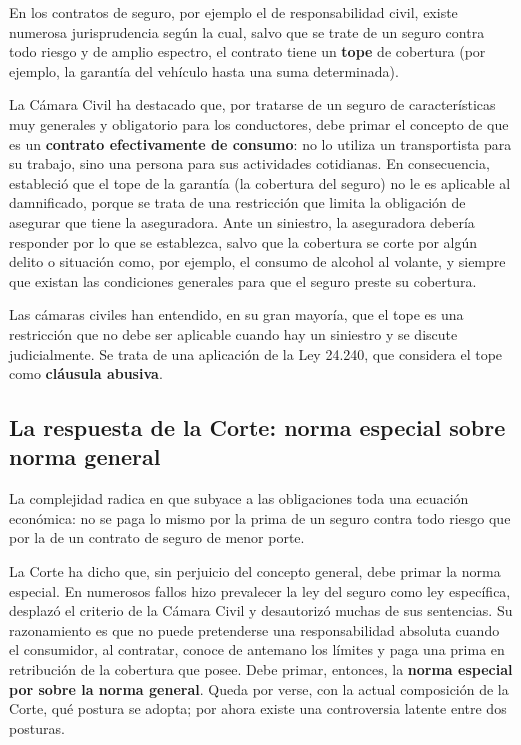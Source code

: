 \documentclass[12pt,oneside]{book}
\begin{document}
En los contratos de seguro, por ejemplo el de responsabilidad civil, existe numerosa jurisprudencia según la cual, salvo que se trate de un seguro contra todo riesgo y de amplio espectro, el contrato tiene un \textbf{tope} de cobertura (por ejemplo, la garantía del vehículo hasta una suma determinada).

La Cámara Civil ha destacado que, por tratarse de un seguro de características muy generales y obligatorio para los conductores, debe primar el concepto de que es un \textbf{contrato efectivamente de consumo}: no lo utiliza un transportista para su trabajo, sino una persona para sus actividades cotidianas. En consecuencia, estableció que el tope de la garantía (la cobertura del seguro) no le es aplicable al damnificado, porque se trata de una restricción que limita la obligación de asegurar que tiene la aseguradora. Ante un siniestro, la aseguradora debería responder por lo que se establezca, salvo que la cobertura se corte por algún delito o situación como, por ejemplo, el consumo de alcohol al volante, y siempre que existan las condiciones generales para que el seguro preste su cobertura.

Las cámaras civiles han entendido, en su gran mayoría, que el tope es una restricción que no debe ser aplicable cuando hay un siniestro y se discute judicialmente. Se trata de una aplicación de la Ley 24.240, que considera el tope como \textbf{cláusula abusiva}.

\subsection{La respuesta de la Corte: norma especial sobre norma general}

La complejidad radica en que subyace a las obligaciones toda una ecuación económica: no se paga lo mismo por la prima de un seguro contra todo riesgo que por la de un contrato de seguro de menor porte.

La Corte ha dicho que, sin perjuicio del concepto general, debe primar la norma especial. En numerosos fallos hizo prevalecer la ley del seguro como ley específica, desplazó el criterio de la Cámara Civil y desautorizó muchas de sus sentencias. Su razonamiento es que no puede pretenderse una responsabilidad absoluta cuando el consumidor, al contratar, conoce de antemano los límites y paga una prima en retribución de la cobertura que posee. Debe primar, entonces, la \textbf{norma especial por sobre la norma general}. Queda por verse, con la actual composición de la Corte, qué postura se adopta; por ahora existe una controversia latente entre dos posturas.
\end{document}
